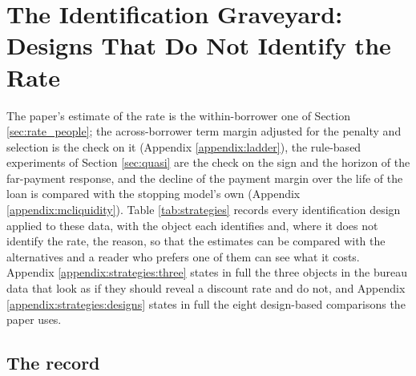 \section{The Identification Graveyard: Designs That Do Not Identify the Rate}\label{appendix:strategies}

The paper's estimate of the rate is the within-borrower one of Section \ref{sec:rate_people}; the across-borrower term margin adjusted for the penalty and selection is the check on it (Appendix \ref{appendix:ladder}), the rule-based experiments of Section \ref{sec:quasi} are the check on the sign and the horizon of the far-payment response, and the decline of the payment margin over the life of the loan is compared with the stopping model's own (Appendix \ref{appendix:mcliquidity}). Table \ref{tab:strategies} records every identification design applied to these data, with the object each identifies and, where it does not identify the rate, the reason, so that the estimates can be compared with the alternatives and a reader who prefers one of them can see what it costs. Appendix \ref{appendix:strategies:three} states in full the three objects in the bureau data that look as if they should reveal a discount rate and do not, and Appendix \ref{appendix:strategies:designs} states in full the eight design-based comparisons the paper uses.
\subsection{The record}

